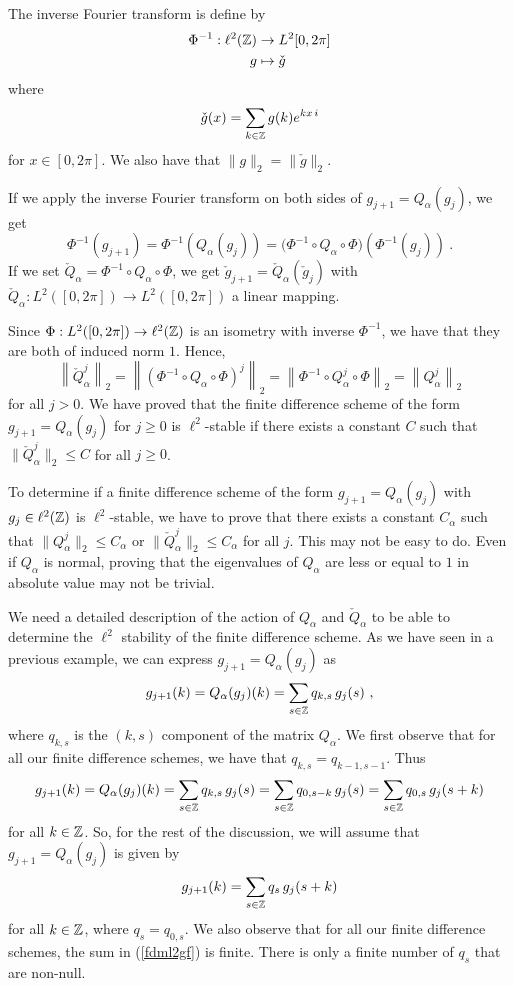 The inverse Fourier transform is define by
\begin{align*}
\Phi^{-1} : \ell^2(\mathbb{Z}) & \to L^2{[0,2\pi]} \\
g & \mapsto \check{g}
\end{align*}
where
\[
  \check{g}(x) = \sum_{k\in \mathbb{Z}} g(k) e^{k x\, i}
\]
for $x \in [0,2\pi]$.  We also have that $\|g\|_2 = \|\check{g}\|_2$.

If we apply the inverse Fourier transform on both sides of
$g_{j+1} = Q_\alpha(g_j)$, we get
\[
\Phi^{-1}(g_{j+1}) = \Phi^{-1}(Q_\alpha(g_j))
= \big(\Phi^{-1}\circ Q_\alpha \circ\Phi\big) (\Phi^{-1}(g_j)) \ .
\]
If we set $\check{Q}_\alpha = \Phi^{-1}\circ Q_\alpha \circ \Phi$, we get
$\check{g}_{j+1} = \check{Q}_\alpha\left(\check{g}_j\right)$ with
$\check{Q}_\alpha: L^2([0,2\pi]) \to L^2([0,2\pi])$ a linear mapping.

Since $\Phi : L^2([0,2\pi]) \to \ell^2(\mathbb{Z})$ is an isometry with
inverse $\Phi^{-1}$, we have that they are both of induced norm $1$.
Hence,
\[
\left\|\check{Q}_\alpha^j\right\|_2
= \left\|\left(\Phi^{-1}\circ Q_\alpha \circ \Phi\right)^j\right\|_2
= \left\|\Phi^{-1}\circ Q_\alpha^j \circ \Phi\right\|_2
= \left\|Q_\alpha^j \right\|_2
\]
for all $j>0$.  We have proved that the finite difference scheme of
the form $g_{j+1} = Q_\alpha(g_j)$ for $j\geq 0$ is $\ell^2$-stable
if there exists a constant $C$ such that $\|\check{Q}_\alpha^j\|_2 \leq C$
for all $j\geq 0$.

To determine if a finite difference scheme of the form
$g_{j+1} = Q_\alpha(g_j)$ with $g_j \in \ell^2(\mathbb{Z})$ is $\ell^2$-stable,
we have to prove that there exists a constant $C_\alpha$ such that
$\|Q_\alpha^j \|_2\leq C_\alpha$ or
$\|\check{Q}_\alpha^j \|_2\leq C_\alpha$ for all $j$.
This may not be easy to do.   Even if $Q_\alpha$ is normal, proving
that the eigenvalues of $Q_\alpha$ are less or equal to $1$ in absolute
value may not be trivial.

We need a detailed description of the action of $Q_\alpha$ and
$\check{Q}_\alpha$ to be able to determine the $\ell^2$ stability of
the finite difference scheme.  As we have seen in a previous example,
we can express $g_{j+1} = Q_\alpha(g_j)$ as
\[
g_{j+1}(k) = Q_\alpha(g_j)(k) = \sum_{s\in \mathbb{Z}} q_{k,s}\, g_j(s) \ ,
\]
where $q_{k,s}$ is the $(k,s)$ component of the matrix $Q_\alpha$.
We first observe that for all our finite difference schemes, we have
that $q_{k,s} = q_{k-1,s-1}$.  Thus
\[
g_{j+1}(k) = Q_\alpha(g_j)(k) = \sum_{s\in \mathbb{Z}} q_{k,s}\, g_j(s)
= \sum_{s\in \mathbb{Z}} q_{0,s-k}\, g_j(s)
= \sum_{s\in \mathbb{Z}} q_{0,s}\, g_j(s+k)
\]
for all $k \in \mathbb{Z}$.  So, for the rest of the discussion, we will
assume that $g_{j+1} = Q_\alpha(g_j)$ is given by
\begin{equation} \label{fdml2gf}
g_{j+1}(k) = \sum_{s\in \mathbb{Z}} q_s\, g_j(s+k)
\end{equation}
for all $k \in \mathbb{Z}$, where $q_s = q_{0,s}$.  We also observe that for
all our finite difference schemes, the sum in (\ref{fdml2gf}) is
finite.   There is only a finite number of $q_s$ that are non-null.

